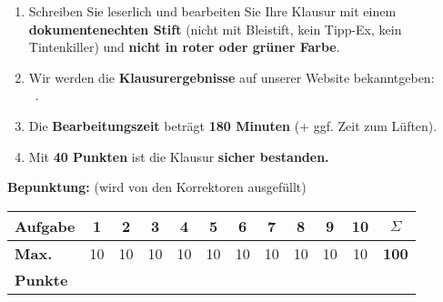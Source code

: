 \documentclass
[
    lang=de,
    folder=../style,
    a4paper,
    12pt,
    parskip=half-,
    numbers=enddot,
    fleqn,
]{../style/smexam}
\begin{document}
\begin{exam}
{\begin{enumerate}
            Täuschungsversuche werden als nicht bestanden gewertet und dem Prüfungsamt gemeldet.
        \item
            Schreiben Sie leserlich und bearbeiten Sie Ihre Klausur mit einem \textbf{dokumentenechten Stift} (nicht mit Bleistift, kein Tipp-Ex, kein Tintenkiller) und \textbf{nicht in roter oder grüner Farbe}.
        \item
            Wir werden die \textbf{Klausurergebnisse} auf unserer Website bekanntgeben:\\
            \ .
        \item
            Die \textbf{Bearbeitungszeit} beträgt \textbf{180 Minuten} (+ ggf. Zeit zum Lüften).
        \item
            Mit \textbf{40 Punkten} ist die Klausur \textbf{sicher bestanden.}
    \end{enumerate}
    }



    \begin{center}
        {\large{\textbf{Bepunktung:}}} (wird von den Korrektoren ausgefüllt)


        \begin{tabular}{|p{2cm}||c|c|c|c|c|c|c|c|c|c||c|}
            \hline
            \textbf{Aufgabe} & 1 & 2 & 3 & 4 & 5 & 6 & 7 & 8 & 9 & 10 & $\Sigma$ \\
            \hline
            \textbf{Max.}   & 10 & 10 & 10 & 10 & 10 & 10  & 10 & 10 & 10 & 10 & \textbf{100}\\
            \hline
            \textbf{Punkte} \newline \mbox{}& & & & & & & & & & & \\
            \hline
        \end{tabular}
    \end{center}



\end{exam}
\end{document}
